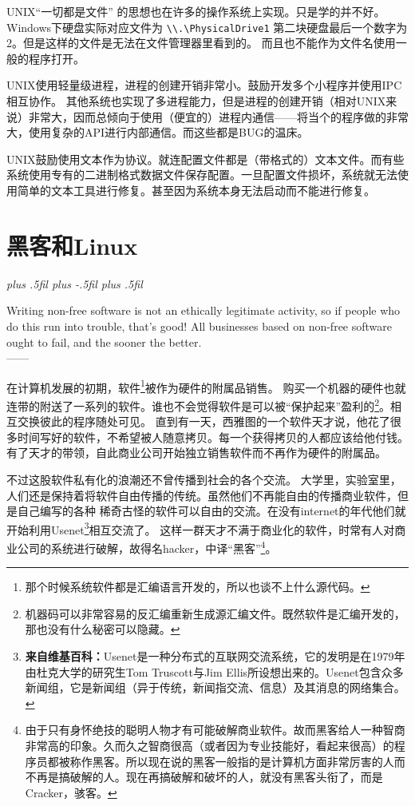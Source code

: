 \documentclass[amstex,twoside]{ctexbook}
\newcommand{\RTLpar}{%
  \leftskip=0pt plus .5fil%
  \rightskip=0pt plus -.5fil%
  \parfillskip=0pt plus .5fil%
}
\newenvironment{quotes}[2][0.55]{\pushQED{#2}%
\begin{flushright}%
\begin{minipage}{#1\textwidth}\begin{flushright}\noindent\it\RTLpar}{%
 \\------\popQED{}\end{flushright}\end{minipage}\end{flushright}}%
\begin{document}

UNIX“一切都是文件” 的思想也在许多的操作系统上实现。只是学的并不好。Windows下硬盘实际对应文件为 \texttt{\textbackslash\textbackslash.\textbackslash{}PhysicalDrive1} 第二块硬盘最后一个数字为2。但是这样的文件是无法在文件管理器里看到的。
而且也不能作为文件名使用一般的程序打开。

UNIX使用轻量级进程，进程的创建开销非常小。鼓励开发多个小程序并使用IPC相互协作。
其他系统也实现了多进程能力，但是进程的创建开销（相对UNIX来说）非常大，因而总倾向于使用（便宜的）进程内通信------将当个的程序做的非常大，使用复杂的API进行内部通信。而这些都是BUG的温床。

UNIX鼓励使用文本作为协议。就连配置文件都是（带格式的）文本文件。而有些系统使用专有的二进制格式数据文件保存配置。一旦配置文件损坏，系统就无法使用简单的文本工具进行修复。甚至因为系统本身无法启动而不能进行修复。

\chapter{黑客和Linux}

\begin{quotes}{Richard Matthew Stallman}
Writing non-free software is not an ethically legitimate activity, so if people who do this run into trouble, that's good! All businesses based on non-free software ought to fail, and the sooner the better.
\end{quotes}

在计算机发展的初期，软件\footnote{那个时候系统软件都是汇编语言开发的，所以也谈不上什么源代码。}被作为硬件的附属品销售。
购买一个机器的硬件也就连带的附送了一系列的软件。谁也不会觉得软件是可以被“保护起来”盈利的\footnote{机器码可以非常容易的反汇编重新生成源汇编文件。既然软件是汇编开发的，那也没有什么秘密可以隐藏。}。相互交换彼此的程序随处可见。
直到有一天，西雅图的一个软件天才说，他花了很多时间写好的软件，不希望被人随意拷贝。每一个获得拷贝的人都应该给他付钱。
有了天才的带领，自此商业公司开始独立销售软件而不再作为硬件的附属品。

不过这股软件私有化的浪潮还不曾传播到社会的各个交流。
大学里，实验室里，人们还是保持着将软件自由传播的传统。虽然他们不再能自由的传播商业软件，但是自己编写的各种
稀奇古怪的软件可以自由的交流。在没有internet的年代他们就开始利用Usenet\footnote{%
\textbf{来自维基百科：}Usenet是一种分布式的互联网交流系统，它的发明是在1979年由杜克大学的研究生Tom Truscott与Jim Ellis所设想出来的。Usenet包含众多新闻组，它是新闻组（异于传统，新闻指交流、信息）及其消息的网络集合。 }相互交流了。
这样一群天才不满于商业化的软件，时常有人对商业公司的系统进行破解，故得名hacker，中译“黑客”\footnote{%
由于只有身怀绝技的聪明人物才有可能破解商业软件。故而黑客给人一种智商非常高的印象。久而久之智商很高（或者因为专业技能好，看起来很高）的程序员都被称作黑客。所以现在说的黑客一般指的是计算机方面非常厉害的人而不再是搞破解的人。现在再搞破解和破坏的人，就没有黑客头衔了，而是Cracker，骇客。
}。
\end{document}
